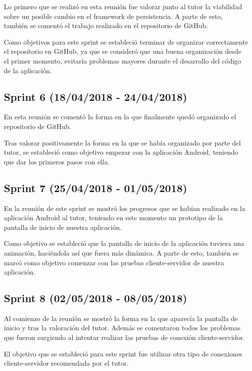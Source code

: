 Lo primero que se realizó en esta reunión fue valorar junto al tutor la viabilidad sobre un posible cambio en el framework de persistencia. A parte de esto, también se comentó el trabajo realizado en el repositorio de GitHub.

Como objetivos para este sprint se estableció terminar de organizar correctamente el repositorio en GitHub, ya que se consideró que una buena organización desde el primer momento, evitaría problemas mayores durante el desarrollo del código de la aplicación.

\subsection{Sprint 6 (18/04/2018 - 24/04/2018)}

En esta reunión se comentó la forma en la que finalmente quedó organizado el repositorio de GitHub.

Tras valorar positivamente la forma en la que se había organizado por parte del tutor, se estableció como objetivo empezar con la aplicación Android, teniendo que dar los primeros pasos con ella.

\subsection{Sprint 7 (25/04/2018 - 01/05/2018)}

En la reunión de este sprint se mostró los progresos que se habían realizado en la aplicación Android al tutor, teniendo en este momento un prototipo de la pantalla de inicio de nuestra aplicación.

Como objetivo se estableció que la pantalla de inicio de la aplicación tuviera una animación, haciéndola así que fuera más dinámica. A parte de esto, también se marcó como objetivo comenzar con las pruebas cliente-servidor de nuestra aplicación.

\subsection{Sprint 8 (02/05/2018 - 08/05/2018)}

Al comienzo de la reunión se mostró la forma en la que aparecía la pantalla de inicio y tras la valoración del tutor. Además se comentaron todos los problemas que fueron surgiendo al intentar realizar las pruebas de conexión cliente-servidor.

El objetivo que se estableció para este sprint fue utilizar otra tipo de conexiones cliente-servidor recomendada por el tutor.

